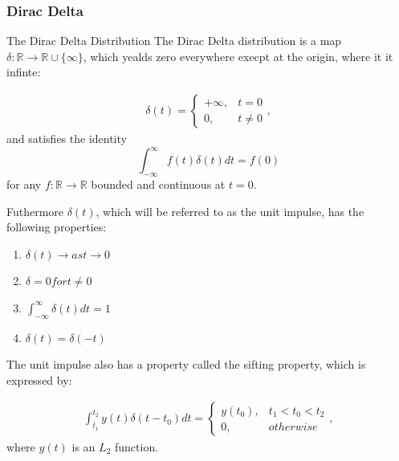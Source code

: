 \subsubsection{Dirac Delta}
\begin{definition}{The Dirac Delta Distribution}
The Dirac Delta distribution is a map $\delta : \mathbb{R} \rightarrow \mathbb{R} \cup \{\infty\}$, which yealds zero everywhere execpt at the origin, where it it infinte:

\begin{align*}
\delta(t) =
    \begin{cases}
    +\infty,& t=0\\
    0, & t \neq 0
\end{cases},
\end{align*}
and satisfies the identity
$$\int_{-\infty}^{\infty} f(t) \delta(t) dt = f(0)$$
for any $f: \mathbb{R} \rightarrow \mathbb{R}$ bounded and continuous at $t=0$.
\end{definition}


Futhermore $\delta(t)$, which will be referred to as the unit impulse, has the following properties:
\begin{enumerate}
    \item $\delta(t) \rightarrow as t \rightarrow 0$
    \item $\delta =0 for t \neq 0$
    \item $\int_{-\infty}^{\infty} \delta(t) dt =1$
    \item $\delta(t)= \delta(-t)$
\end{enumerate}

\noindent The unit impulse also has a property called the sifting property, which is expressed by:

\begin{align*}
\int_{t_1}^{t_2} y(t) \delta(t-t_0)dt = 
    \begin{cases}
    y(t_0),& t_1<t_0<t_2\\
    0, & otherwise
\end{cases},
\end{align*}
where $y(t)$ is an $L_2$ function. 